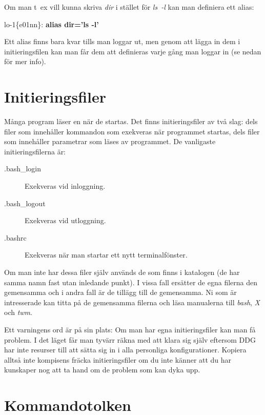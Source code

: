 \documentclass[a4paper,twocolumn]{book}
\begin{document}
Om man t~ex vill kunna skriva \emph{dir} i stället för \emph{ls~-l}
kan man definiera ett alias:
\begin{example}
  lo-1\{e01nn\}: \textbf{alias dir='ls -l'}
\end{example}

Ett alias finns bara kvar tills man loggar ut,
men genom att lägga in dem i initieringsfilen  kan man
får dem att definieras varje gång man loggar in (se nedan för
mer info).

\section{Initieringsfiler}

Många program läser en  när de startas. Det
finns initieringsfiler av två slag: dels filer som innehåller
kommandon som exekveras när programmet startas, dels filer som
innehåller parametrar som läses av programmet. De vanligaste
initieringsfilerna är:
\begin{description}
\item[.bash\_login] Exekveras vid inloggning.
\item[.bash\_logout] Exekveras vid utloggning.
\item[.bashrc] Exekveras när man startar ett nytt
  terminalfönster.
\end{description}

Om man inte har dessa filer själv används de som finns i katalogen
 (de har samma namn fast utan inledande punkt). I
vissa fall ersätter de egna filerna den gemensamma och i andra fall är
de tillägg till de gemensamma. Ni som är intresserade kan titta på de
gemensamma filerna och läsa manualerna till \emph{bash}, \emph{X} och
\emph{twm}.

Ett varningens ord är på sin plats: Om man har egna initieringsfiler kan man
få problem. I det läget får man tyvärr räkna med att klara sig själv eftersom
DDG har inte resurser till att sätta sig in i alla personliga konfigurationer.
Kopiera alltså inte kompisens fräcka initieringsfiler om du inte känner att du
har kunskaper nog att ta hand om de problem som kan dyka upp.

\section{Kommandotolken}
\end{document}
